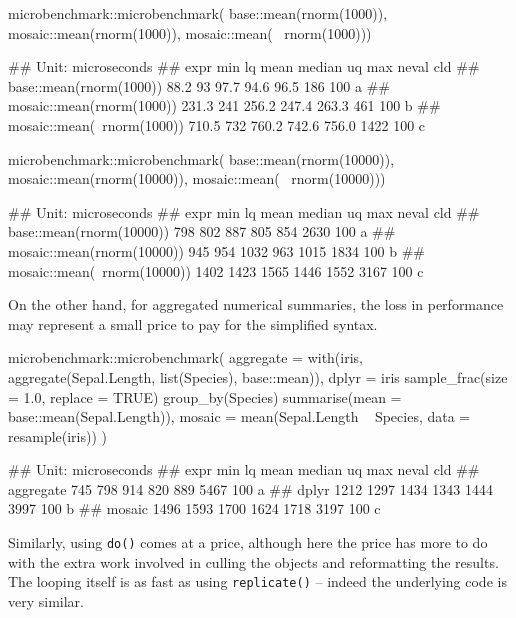 \begin{Schunk}
\begin{Sinput}
microbenchmark::microbenchmark( 
  base::mean(rnorm(1000)), 
  mosaic::mean(rnorm(1000)), 
  mosaic::mean(~ rnorm(1000)))
\end{Sinput}
\begin{Soutput}
## Unit: microseconds
##                        expr   min  lq  mean median    uq  max neval cld
##     base::mean(rnorm(1000))  88.2  93  97.7   94.6  96.5  186   100 a  
##   mosaic::mean(rnorm(1000)) 231.3 241 256.2  247.4 263.3  461   100  b 
##  mosaic::mean(~rnorm(1000)) 710.5 732 760.2  742.6 756.0 1422   100   c
\end{Soutput}
\begin{Sinput}
microbenchmark::microbenchmark( 
  base::mean(rnorm(10000)), 
  mosaic::mean(rnorm(10000)), 
  mosaic::mean(~ rnorm(10000)))
\end{Sinput}
\begin{Soutput}
## Unit: microseconds
##                         expr  min   lq mean median   uq  max neval cld
##     base::mean(rnorm(10000))  798  802  887    805  854 2630   100 a  
##   mosaic::mean(rnorm(10000))  945  954 1032    963 1015 1834   100  b 
##  mosaic::mean(~rnorm(10000)) 1402 1423 1565   1446 1552 3167   100   c
\end{Soutput}
\end{Schunk}

On the other hand, for aggregated numerical summaries, the loss in
performance may represent a small price to pay for the simplified
syntax.

\begin{Schunk}
\begin{Sinput}
microbenchmark::microbenchmark( 
  aggregate = with(iris, aggregate(Sepal.Length, list(Species), base::mean)),
  dplyr = iris %
    sample_frac(size = 1.0, replace = TRUE) %
    group_by(Species) %
    summarise(mean = base::mean(Sepal.Length)),
  mosaic = mean(Sepal.Length ~ Species, data = resample(iris))
)
\end{Sinput}
\begin{Soutput}
## Unit: microseconds
##       expr  min   lq mean median   uq  max neval cld
##  aggregate  745  798  914    820  889 5467   100 a  
##      dplyr 1212 1297 1434   1343 1444 3997   100  b 
##     mosaic 1496 1593 1700   1624 1718 3197   100   c
\end{Soutput}
\end{Schunk}

Similarly, using \texttt{do()} comes at a price, although here the price
has more to do with the extra work involved in culling the objects and
reformatting the results. The looping itself is as fast as using
\texttt{replicate()} -- indeed the underlying code is very similar.

